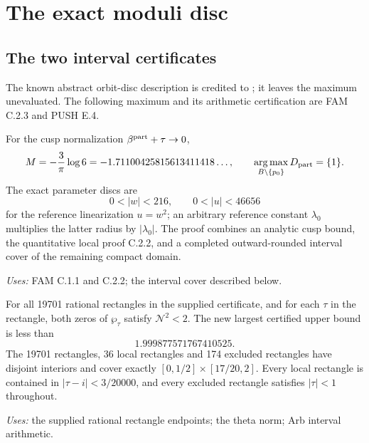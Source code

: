\section{The exact moduli disc}\label{sec:maximum}

\subsection{The two interval certificates}
The known abstract orbit-disc description is credited to \cite[Corollary~\texttt{p2:cor:bare-period}]{DGKXv1}; it leaves the maximum unevaluated. The following maximum and its arithmetic certification are FAM C.2.3 and PUSH E.4.

\begin{computed}[FAM C.2.3; T]\label{fam:C.2.3}
For the cusp normalization $\beta^{\rm part}+\tau\to0$,
\[
 M=-\frac3\pi\log6=-1.71100425815613411418\ldots,
 \qquad \operatorname*{arg\,max}_{B\setminus\{p_0\}}D_{\rm part}=\{1\}.
\]
The exact parameter discs are
\[
 0<|w|<216,
 \qquad 0<|u|<46656
\]
for the reference linearization $u=w^2$; an arbitrary reference constant
$\lambda_0$ multiplies the latter radius by $|\lambda_0|$.
The proof combines an analytic cusp bound, the quantitative local proof
C.2.2, and a completed outward-rounded interval cover of the remaining
compact domain.
\end{computed}
\noindent\textit{Uses:} FAM C.1.1 and C.2.2; the interval cover described below.\par

\begin{computed}[PUSH E.4.1; T]\label{push:E.4.1}
For all 19701 rational rectangles in the supplied certificate, and for
each $\tau$ in the rectangle, both zeros of $\wp_\tau$ satisfy
$\mathcal N^2<2$. The new largest certified upper bound is less than
\[
 1.999877571767410525.
\]
The 19701 rectangles, 36 local rectangles and 174 excluded rectangles
have disjoint interiors and cover exactly
$[0,1/2]\times[17/20,2]$. Every local rectangle is contained in
$|\tau-i|<3/20000$, and every excluded rectangle satisfies
$|\tau|<1$ throughout.
\end{computed}
\noindent\textit{Uses:} the supplied rational rectangle endpoints; the theta norm; Arb interval arithmetic.\par

